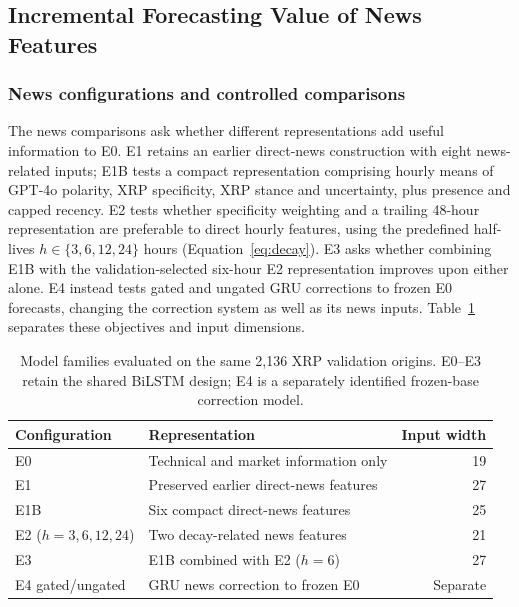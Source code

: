 \subsection{Incremental Forecasting Value of News Features}
\label{subsec:news-representation-results}

\subsubsection{News configurations and controlled comparisons}

The news comparisons ask whether different representations add useful information to E0. E1 retains an earlier direct-news construction with eight news-related inputs; E1B tests a compact representation comprising hourly means of GPT-4o polarity, XRP specificity, XRP stance and uncertainty, plus presence and capped recency. E2 tests whether specificity weighting and a trailing 48-hour representation are preferable to direct hourly features, using the predefined half-lives $h\in\{3,6,12,24\}$ hours (Equation~\eqref{eq:decay}). E3 asks whether combining E1B with the validation-selected six-hour E2 representation improves upon either alone. E4 instead tests gated and ungated GRU corrections to frozen E0 forecasts, changing the correction system as well as its news inputs. Table~\ref{tab:matched_configuration_design} separates these objectives and input dimensions.

\begin{table}[!htbp]
\centering\small
\caption{Model families evaluated on the same 2,136 XRP validation origins. E0--E3 retain the shared BiLSTM design; E4 is a separately identified frozen-base correction model.}
\label{tab:matched_configuration_design}
\begin{tabular}{lp{6.7cm}r}
\toprule
Configuration & Representation & Input width \\
\midrule
E0 & Technical and market information only & 19 \\
E1 & Preserved earlier direct-news features & 27 \\
E1B & Six compact direct-news features & 25 \\
E2 ($h=3,6,12,24$) & Two decay-related news features & 21 \\
E3 & E1B combined with E2 ($h=6$) & 27 \\
E4 gated/ungated & GRU news correction to frozen E0 & Separate \\
\bottomrule
\end{tabular}
\end{table}

